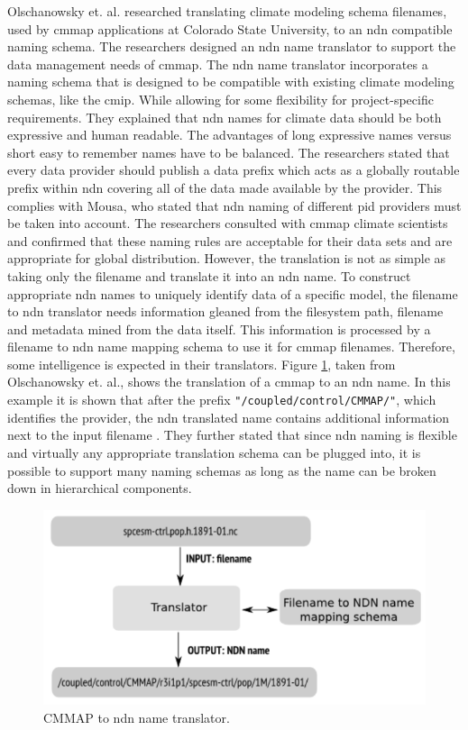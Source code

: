 Olschanowsky et. al. researched translating climate modeling schema filenames, used by \gls{cmmap} applications at Colorado State University, to an \gls{ndn} compatible 
naming schema. The researchers designed an \gls{ndn} name translator to support the data management needs of \gls{cmmap}. The \gls{ndn} name translator incorporates a naming schema that is designed to be compatible with existing climate modeling schemas, like the \gls{cmip}. While allowing for some flexibility for project-specific requirements. They explained that \gls{ndn} names for climate data should be both expressive and human readable. The advantages of long expressive names versus short easy to remember names have to be balanced.
The researchers stated that every data provider should publish a data prefix which acts as a globally
routable prefix within \gls{ndn} covering all of the data made available by the provider. This complies with Mousa, who stated that \gls{ndn} naming of different \gls{pid} providers must be taken into account. The researchers consulted with \gls{cmmap} climate scientists and confirmed that these naming rules are acceptable for their data sets and are appropriate for global distribution. 
However, the translation is not as simple as taking only the filename and translate it into an \gls{ndn} name. To construct appropriate \gls{ndn} names to uniquely identify data of a specific model, the filename to \gls{ndn} translator needs information gleaned from the filesystem path, filename and metadata mined from the data itself. This information is processed by a filename to \gls{ndn} name mapping schema to use it for \gls{cmmap} filenames. Therefore, some intelligence is expected in their translators.
Figure \ref{fig:cmmap_ndnn}, taken from Olschanowsky et. al., shows the translation of a \gls{cmmap} to an \gls{ndn} name. In this example it is shown that after the prefix \texttt{"/coupled/control/CMMAP/"}, which identifies the provider, the \gls{ndn} translated name contains additional information next to the input filename \cite{ndn-clim}.
They further stated that since \gls{ndn} naming is flexible and virtually any appropriate translation schema can be plugged into, it is possible to support many naming schemas as long as the name can be broken down in hierarchical components.

\begin{figure}[H]
\centering
\includegraphics[scale=0.4]{Images/cmip2ndn.png}
\caption{CMMAP to \gls{ndn} name translator.}
\label{fig:cmmap_ndnn}
\end{figure}

